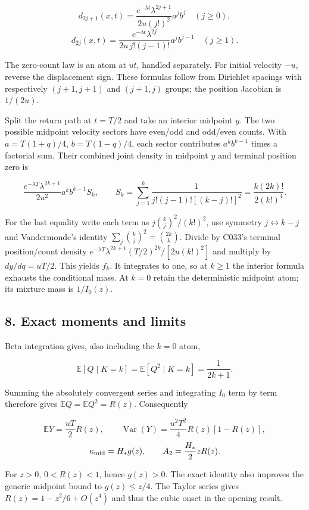 \documentclass[11pt,a4paper]{article}
\begin{document}
\[d_{2j+1}(x,t)=\frac{e^{-\lambda t}\lambda^{2j+1}}{2u(j!)^2}a^jb^j
\quad(j\ge0),\]
\[d_{2j}(x,t)=\frac{e^{-\lambda t}\lambda^{2j}}{2u\,j!(j-1)!}a^jb^{j-1}
\quad(j\ge1).\]

The zero-count law is an atom at \(ut\), handled separately. For initial
velocity \(-u\), reverse the displacement sign. These formulas follow
from Dirichlet spacings with respectively \((j+1,j+1)\) and \((j+1,j)\)
groups; the position Jacobian is \(1/(2u)\).

Split the return path at \(t=T/2\) and take an interior midpoint \(y\).
The two possible midpoint velocity sectors have even/odd and odd/even
counts. With \(a=T(1+q)/4\), \(b=T(1-q)/4\), each sector contributes
\(a^kb^{k-1}\) times a factorial sum. Their combined joint density in
midpoint \(y\) and terminal position zero is

\[\frac{e^{-\lambda T}\lambda^{2k+1}}{2u^2}a^kb^{k-1}S_k,
\qquad S_k=\sum_{j=1}^k\frac1{j!(j-1)![(k-j)!]^2}
             =\frac{k(2k)!}{2(k!)^4}.\]

For the last equality write each term as \(j\binom{k}{j}^2/(k!)^2\), use
symmetry \(j\leftrightarrow k-j\) and Vandermonde's identity
\(\sum_j\binom{k}{j}^2=\binom{2k}{k}\). Divide by C033's terminal
position/count density
\(e^{-\lambda T}\lambda^{2k+1}(T/2)^{2k}/[2u(k!)^2]\) and multiply by
\(dy/dq=uT/2\). This yields \(f_k\). It integrates to one, so at
\(k\ge1\) the interior formula exhausts the conditional mass. At \(k=0\)
retain the deterministic midpoint atom; its mixture mass is
\(1/I_0(z)\).

\hypertarget{exact-moments-and-limits}{%
\subsection{8. Exact moments and
limits}\label{exact-moments-and-limits}}

Beta integration gives, also including the \(k=0\) atom,

\[\mathbb E[Q\mid K=k]=\mathbb E[Q^2\mid K=k]=\frac1{2k+1}.\]

Summing the absolutely convergent series and integrating \(I_0\) term by
term therefore gives \(\mathbb E Q=\mathbb E Q^2=R(z)\). Consequently

\[\mathbb E Y=\frac{uT}{2}R(z),\qquad
\operatorname{Var}(Y)=\frac{u^2T^2}{4}R(z)[1-R(z)],\]
\[\kappa_{\rm mid}=H_*g(z),\qquad A_2=\frac{H_*}{2}zR(z).\]

For \(z>0\), \(0<R(z)<1\), hence \(g(z)>0\). The exact identity also
improves the generic midpoint bound to \(g(z)\le z/4\). The Taylor
series gives \(R(z)=1-z^2/6+O(z^4)\) and thus the cubic onset in the
opening result.
\end{document}
